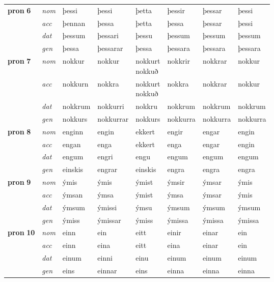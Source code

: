 \begin{longtable}[l]{X>{\footnotesize\itshape}XXXXXXX}
\multirow{3}{*}{{{\textbf{pron} \Large{\textbf{6}}}}}  & nom & þessi & þessi    & þetta & þessir & þessar & þessi \\*
  & acc &  þennan  & þessa   & þetta & þessa & þessar & þessi \\*
&  dat & þessum & þessari   & þessu & þessum & þessum & þessum \\*
  & gen & þessa  & þessarar  & þessa & þessara & þessara & þessara\\
\cmidrule{1-8}

\multirow{3}{*}{{{\textbf{pron} \Large{\textbf{7}}}}}  & nom & nokkur & nokkur    & \specialcell{nokkurt\\ nokkuð} & nokkrir & nokkrar & nokkur \\*
  & acc &  nokkurn  & nokkra   & \specialcell{nokkurt\\ nokkuð} & nokkra & nokkrar & nokkur \\*
&  dat & nokkrum & nokkurri   & nokkru & nokkrum & nokkrum & nokkrum \\*
  & gen & nokkurs  & nokkurrar  & nokkurs & nokkurra & nokkurra & nokkurra\\
\cmidrule{1-8}

\multirow{3}{*}{{{\textbf{pron} \Large{\textbf{8}}}}}  & nom & enginn & engin    & ekkert & engir & engar & engin \\*
  & acc &  engan  & enga   & ekkert & enga & engar & engin \\*
&  dat & engum & engri   & engu & engum & engum & engum \\*
  & gen & einskis  & engrar  & einskis & engra & engra & engra\\
\cmidrule{1-8}

\multirow{3}{*}{{{\textbf{pron} \Large{\textbf{9}}}}}  & nom & ýmis & ýmis    & ýmist & ýmsir & ýmsar & ýmis \\*
  & acc &  ýmsan  & ýmsa   & ýmist & ýmsa & ýmsar & ýmis \\*
&  dat & ýmsum & ýmissi   & ýmsu & ýmsum & ýmsum & ýmsum \\*
  & gen & ýmiss  & ýmissar  & ýmiss & ýmissa & ýmissa & ýmissa\\
\cmidrule{1-8}

\multirow{3}{*}{{{\textbf{pron} \Large{\textbf{10}}}}}  & nom & einn & ein    & eitt & einir & einar & ein \\*
  & acc &  einn  & eina   & eitt & eina & einar & ein \\*
&  dat & einum & einni   & einu & einum & einum & einum \\*
  & gen & eins  & einnar  & eins & einna & einna & einna\\
\cmidrule{1-8}


\end{longtable}
